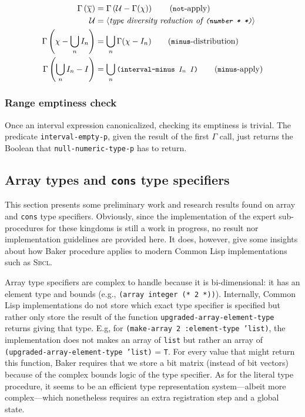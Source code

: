 \documentclass[format=sigconf]{acmart}
\newcommand\code[2][\small]{\sloppy\texttt{#1#2}}
\newcommand\mcode[2][\small]{\text{\code[#1]{#2}}}
\theoremstyle{definition}
\newcommand\sbcl{\textsc{Sbcl}}
\begin{document}
\begin{align}
  \Gamma\left(\overline{\chi}\right) &= \Gamma\left(\mathcal{U} - \Gamma(\chi)\right) \label{eq:notapply}\tag{\code{not}-apply}\\
  \mathcal{U} &= \langle\text{\it type diversity reduction of \code{(number * *)}}\rangle \nonumber\\
  \Gamma\left(\chi - \bigcup_n I_n\right) &= \bigcup_n \Gamma(\chi - I_n) \label{eq:minusdist}\tag{\code{minus}-distribution} \\
  \Gamma\left(\bigcup_n I_n - I\right) &= \bigcup_n \mcode{(interval-minus $I_n$ $I$)} \label{eq:minusapply}\tag{\code{minus}-apply}
\end{align}

\subsubsection{Range emptiness check}
Once an interval expression canonicalized, checking its emptiness is trivial.
The predicate \code{interval-empty-p}, given the result of the first $\Gamma$
call, just returns the Boolean that \code{null-numeric-type-p} has to return.


\subsection{Array types and \code[\large]{cons} type specifiers}
\label{sec:expoth}
This section presents some preliminary work and research results found on array
and \code{cons} type specifiers. Obviously, since the implementation of the
expert sub-procedures for these kingdoms is still a work in progress, no result
nor implementation guidelines are provided here. It does, however, give some
insights about how Baker procedure applies to modern Common Lisp implementations
such as \sbcl.

Array type specifiers are complex to handle because it is bi-dimensional: it
has an element type and bounds (e.g., \code{(array integer (* 2 *))}).
Internally, Common Lisp implementations do not store which exact type
specifier is specified but rather only store the result of the function
\code{upgraded-array-element-type} returns giving that type. E.g, for
\code{(make-array 2 :element-type 'list)}, the implementation does not makes an
array of \code{list} but rather an array of \code{(upgraded-array-element-type
  'list)} = \code{T}. For every value that might return this function, Baker
requires that we store a bit matrix (instead of bit vectors) because of the
complex bounds logic of the type specifier. As for the literal type procedure,
it seems to be an efficient type representation system---albeit more
complex---which nonetheless requires an extra registration step and a global
state.
\end{document}
